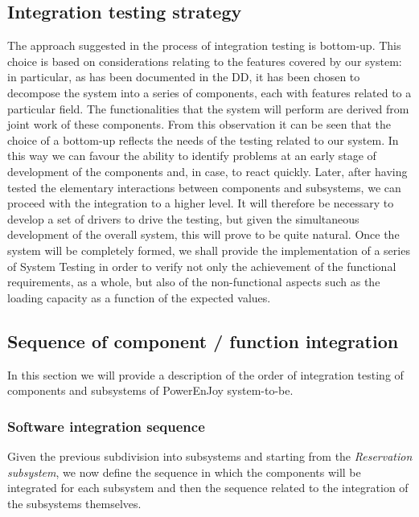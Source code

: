 \documentclass[10pt, a4paper,titlepage]{article}
\begin{document}
\subsection{Integration testing strategy}
The approach suggested in the process of integration testing is bottom-up.
This choice is based on considerations relating to the features covered by our system: in particular, as has been documented in the DD, it has been chosen to decompose the system into a series of components, each with features related to a particular field. The functionalities that the system will perform are derived from joint work of these components. From this observation it can be seen that the choice of a bottom-up reflects the needs of the testing related to our system.
In this way we can favour the ability to identify problems at an early stage of development of the components and, in case, to react quickly. 
Later, after having tested the elementary interactions between components and subsystems, we can proceed with the integration to a higher level.
It will therefore be necessary to develop a set of drivers to drive the testing, but given the simultaneous development of the overall system, this will prove to be quite natural.
Once the system will be completely formed, we shall provide the implementation of a series of System Testing in order to verify not only the achievement of the functional requirements, as a whole, but also of the non-functional aspects such as the loading capacity as a function of the expected values.
\subsection{Sequence of component / function integration}
In this section we will provide a description of the order of integration testing of components and subsystems of PowerEnJoy system-to-be.
\subsubsection{Software integration sequence}
Given the previous subdivision into subsystems and starting from the \emph{Reservation subsystem}, we now define the sequence in which the components will be integrated for each subsystem and then the sequence related to the integration of the subsystems themselves.
\end{document}
